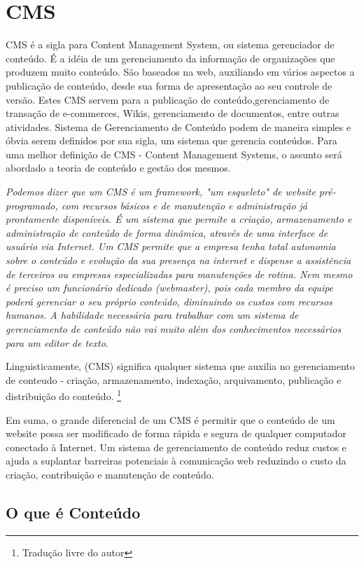 \chapter{CMS}

CMS é a sigla para Content Management System, ou sistema gerenciador de conteúdo. É a idéia de um gerenciamento da informação de organizações que produzem muito conteúdo. São baseados na web, auxiliando em vários aspectos a publicação de conteúdo, desde sua forma de apresentação ao seu controle de versão. Estes CMS servem para a publicação de conteúdo,gerenciamento de transação de e-commerces, Wikis, gerenciamento de documentos, entre outras atividades. Sistema de Gerenciamento de Conteúdo podem de maneira simples e óbvia serem definidos por sua sigla, um sistema que gerencia conteúdos. Para uma melhor definição de CMS - Content Management Systems, o assunto será abordado a teoria de conteúdo e gestão dos mesmos.

\emph{Podemos dizer que um CMS é um framework, "um esqueleto" de website pré-programado, com recursos básicos e de manutenção e administração já prontamente disponíveis. É um sistema que permite a criação, armazenamento e administração de conteúdo de forma dinâmica, através de uma interface de usuário via Internet. Um CMS permite que a empresa tenha total autonomia sobre o conteúdo e evolução da sua presença na internet e dispense a assistência de terceiros ou empresas especializadas para manutenções de rotina. Nem mesmo é preciso um funcionário dedicado (webmaster), pois cada membro da equipe poderá gerenciar o seu próprio conteúdo, diminuindo os custos com recursos humanos. A habilidade necessária para trabalhar com um sistema de gerenciamento de conteúdo não vai muito além dos conhecimentos necessários para um editor de texto.} \cite{navita}

Linguisticamente, (CMS) significa qualquer sistema que auxilia no gerenciamento de conteudo - criação, armazenamento, indexação, arquivamento, publicação e distribuição do conteúdo.
\cite{what_is_cms}\footnote{Tradução livre do autor}

Em suma, o grande diferencial de um CMS é permitir que o conteúdo de um website possa ser modificado de forma rápida e segura de qualquer computador conectado à Internet. Um sistema de gerenciamento de conteúdo reduz custos e ajuda a suplantar barreiras potenciais à comunicação web reduzindo o custo da criação, contribuição e manutenção de conteúdo.
\cite{navita}

\section{O que é Conteúdo}

